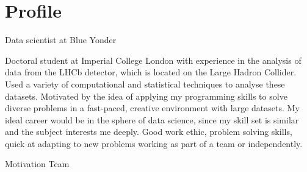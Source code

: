 \section{Profile}


\cvline{}{}
{
  Data scientist at Blue Yonder

  Doctoral student at Imperial College London with experience in the analysis of data
  from the LHCb detector, which is located on the Large Hadron Collider.
  Used a variety of computational and statistical techniques to analyse these datasets.
  Motivated by the idea of applying my programming skills to
  solve diverse problems in a fast-paced, creative environment with large datasets.
  My ideal career would be in the sphere of data science, since my skill set is similar and
  the subject interests me deeply.
  Good work ethic, problem solving skills, quick at adapting to new problems working as part of a
  team or independently.


  Motivation
  Team

}
















